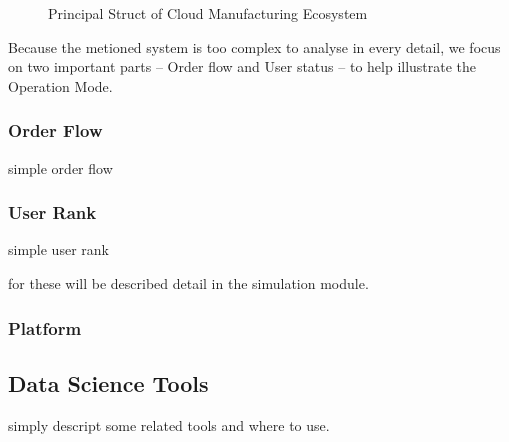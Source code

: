 \begin{figure}[!h]
\centering

\caption{Principal Struct of Cloud Manufacturing Ecosystem}
\end{figure}
Because the metioned system is too complex to analyse in every detail, we focus on two important parts -- Order flow and User status -- to help illustrate the Operation Mode.

\subsubsection{Order Flow}
simple order flow
\subsubsection{User Rank}
simple user rank

for these will be described detail in the simulation module.
\subsubsection{Platform}


\subsection{Data Science Tools}
simply descript some related tools and where to use.
